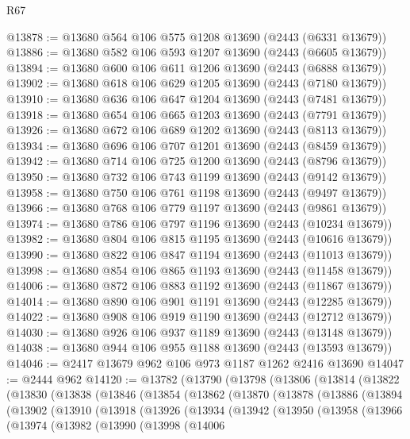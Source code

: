 \begin{lexlean}{R67}
\begin{coremodule}
@13878 := @13680 @564 @106 @575 @1208 @13690 (@2443 (@6331 @13679))
@13886 := @13680 @582 @106 @593 @1207 @13690 (@2443 (@6605 @13679))
@13894 := @13680 @600 @106 @611 @1206 @13690 (@2443 (@6888 @13679))
@13902 := @13680 @618 @106 @629 @1205 @13690 (@2443 (@7180 @13679))
@13910 := @13680 @636 @106 @647 @1204 @13690 (@2443 (@7481 @13679))
@13918 := @13680 @654 @106 @665 @1203 @13690 (@2443 (@7791 @13679))
@13926 := @13680 @672 @106 @689 @1202 @13690 (@2443 (@8113 @13679))
@13934 := @13680 @696 @106 @707 @1201 @13690 (@2443 (@8459 @13679))
@13942 := @13680 @714 @106 @725 @1200 @13690 (@2443 (@8796 @13679))
@13950 := @13680 @732 @106 @743 @1199 @13690 (@2443 (@9142 @13679))
@13958 := @13680 @750 @106 @761 @1198 @13690 (@2443 (@9497 @13679))
@13966 := @13680 @768 @106 @779 @1197 @13690 (@2443 (@9861 @13679))
@13974 := @13680 @786 @106 @797 @1196 @13690 (@2443 (@10234 @13679))
@13982 := @13680 @804 @106 @815 @1195 @13690 (@2443 (@10616 @13679))
@13990 := @13680 @822 @106 @847 @1194 @13690 (@2443 (@11013 @13679))
@13998 := @13680 @854 @106 @865 @1193 @13690 (@2443 (@11458 @13679))
@14006 := @13680 @872 @106 @883 @1192 @13690 (@2443 (@11867 @13679))
@14014 := @13680 @890 @106 @901 @1191 @13690 (@2443 (@12285 @13679))
@14022 := @13680 @908 @106 @919 @1190 @13690 (@2443 (@12712 @13679))
@14030 := @13680 @926 @106 @937 @1189 @13690 (@2443 (@13148 @13679))
@14038 := @13680 @944 @106 @955 @1188 @13690 (@2443 (@13593 @13679))
@14046 := @2417 @13679 @962 @106 @973 @1187 @1262 @2416 @13690
@14047 := @2444 @962
@14120 := @13782
    (@13790
      (@13798
        (@13806
          (@13814
            (@13822
              (@13830
                (@13838
                  (@13846
                    (@13854
                      (@13862
                        (@13870
                          (@13878
                            (@13886
                              (@13894
                                (@13902
                                  (@13910
                                    (@13918
                                      (@13926
                                        (@13934
                                          (@13942
                                            (@13950
                                              (@13958
                                                (@13966
                                                  (@13974
                                                    (@13982
                                                      (@13990
                                                        (@13998
                                                          (@14006

\end{coremodule}
\end{lexlean}
